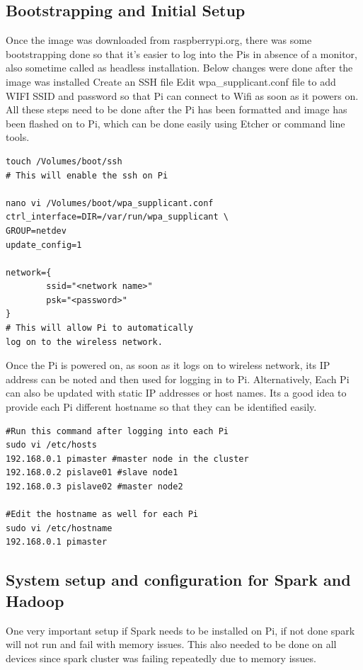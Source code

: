 \subsection{Bootstrapping and Initial Setup}
Once the image was downloaded from raspberrypi.org, there was some bootstrapping done so that it's easier to log into the Pis in absence of a monitor, also sometime called as headless installation.
Below changes were done after the image was installed
Create an SSH file
Edit wpa\_supplicant.conf file to add WIFI SSID and password so that Pi can connect to Wifi as soon as it powers on. All these steps need to be done after the Pi has been formatted and image has been flashed on to Pi, which can be done easily using Etcher or command line tools.
\begin{verbatim}
touch /Volumes/boot/ssh
# This will enable the ssh on Pi

nano vi /Volumes/boot/wpa_supplicant.conf
ctrl_interface=DIR=/var/run/wpa_supplicant \
GROUP=netdev
update_config=1

network={
        ssid="<network name>"
        psk="<password>"
}
# This will allow Pi to automatically 
log on to the wireless network.

\end{verbatim}

Once the Pi is powered on, as soon as it logs on to wireless network, its IP address can be noted and then used for logging in to Pi. Alternatively, Each Pi can also be updated with static IP addresses or host names. Its a good idea to provide each Pi different hostname so that they can be identified easily. 

\begin{verbatim}
#Run this command after logging into each Pi
sudo vi /etc/hosts
192.168.0.1 pimaster #master node in the cluster
192.168.0.2 pislave01 #slave node1 
192.168.0.3 pislave02 #master node2 

#Edit the hostname as well for each Pi
sudo vi /etc/hostname
192.168.0.1	pimaster
\end{verbatim}

\subsection{System setup and configuration for Spark and Hadoop}
One very important setup if Spark needs to be installed on Pi, if not done spark will not run and fail with memory issues. This also needed to be done on all devices since spark cluster was failing repeatedly due to memory issues.

